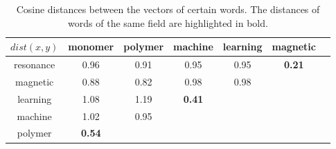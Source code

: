\begin{table}[]
    \centering
    \begin{tabular}{c|c c c c c c}
       $dist(x,y)$ & monomer & polymer & machine & learning & magnetic  \\
       \hline
       resonance & 0.96 & 0.91 & 0.95 & 0.95 & \textbf{0.21} & \\
       magnetic & 0.88 & 0.82 & 0.98 & 0.98 & & \\
       learning & 1.08 & 1.19 & \textbf{0.41} & & & \\
       machine & 1.02 & 0.95 & & & & \\
       polymer & \textbf{0.54} & & & & & \\
    \end{tabular}
    \caption{Cosine distances between the vectors of certain words. The distances of words of the same field are highlighted in bold.}
    \label{tab:embeddings_examples}
\end{table}
